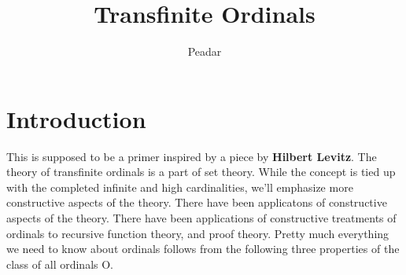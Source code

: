 \documentclass[a4paper,10pt]{article}
\title{Transfinite Ordinals}
\author{Peadar}
\begin{document}
\maketitle



\section{Introduction}
This is supposed to be a primer inspired by a piece by \textbf{Hilbert Levitz}.
The theory of transfinite ordinals is a part of set theory. While the concept 
is tied up with the completed infinite and high cardinalities, we'll emphasize more
constructive aspects of the theory. There have been applicatons of constructive aspects of the 
theory. There have been applications of constructive treatments of ordinals to recursive 
function theory, and proof theory. 
  Pretty much everything we need to know about ordinals follows from the following three properties of 
the class of all ordinals O. 
\end{document}
